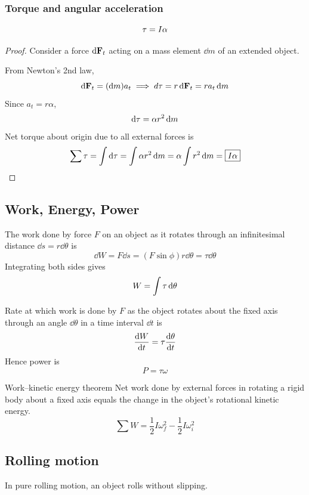 \subsubsection{Torque and angular acceleration}
\begin{equation}
\vb{\tau} = I\alpha
\end{equation}
\begin{proof}
Consider a force $\dd{\vb{F}}_t$ acting on a mass element $\dd{m}$ of an extended object. 

From Newton's 2nd law,
\[ \dd{\vb{F}}_t = (\dd{m})a_t \implies d\vb{\tau} = r\dd{\vb{F}}_t = ra_t\dd{m} \]
Since $a_t=r\alpha$,
\[ \dd{\vb{\tau}} =  \alpha r^2\dd{m} \]
Net torque about origin due to all external forces is 
\[ \sum\vb{\tau} = \int\dd{\vb{\tau}} = \int\alpha r^2\dd{m} = \alpha\int r^2\dd{m} = \boxed{I\alpha}  \]
\end{proof}
\pagebreak

\subsection{Work, Energy, Power}
The work done by force $F$ on an object as it rotates through an infinitesimal distance $\dd{s}=r\dd{\theta}$ is
\[ \dd{W} = F\dd{s} = (F\sin\phi)r\dd{\theta} = \tau\dd{\theta} \]
Integrating both sides gives
\begin{equation}
W = \int \vb{\tau} \dd{\theta}
\end{equation}

Rate at which work is done by $F$ as the object rotates about the fixed axis through an angle $\dd{\theta}$ in a time interval $\dd{t}$ is
\[ \odv{W}{t} = \tau\odv{\theta}{t} \]
Hence power is
\begin{equation}
P=\tau\omega
\end{equation}

\begin{thrm}{Work--kinetic energy theorem}{}
Net work done by external forces in rotating a rigid body about a fixed axis equals the change in the object's rotational kinetic energy.
\begin{equation}
\sum W = \frac{1}{2}I\omega_f^2 - \frac{1}{2}I\omega_i^2
\end{equation}
\end{thrm}
\pagebreak

\subsection{Rolling motion}
In pure rolling motion, an object rolls without slipping. 

